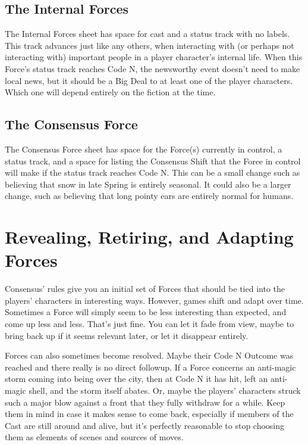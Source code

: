 \documentclass[
  oneside,
  statementpaper,
  9pt]{memoir}
\begin{document}
\hypertarget{the-internal-forces}{%
\subsection{The Internal Forces}\label{the-internal-forces}}

The Internal Forces sheet has space for cast and a status track with no
labels. This track advances just like any others, when interacting with
(or perhaps not interacting with) important people in a player
character's internal life. When this Force's status track reaches Code
N, the newsworthy event doesn't need to make local news, but it should
be a Big Deal to at least one of the player characters. Which one will
depend entirely on the fiction at the time.

\hypertarget{the-consensus-force}{%
\subsection{The Consensus Force}\label{the-consensus-force}}

The Consensus Force sheet has space for the Force(s) currently in
control, a status track, and a space for listing the Consensus Shift
that the Force in control will make if the status track reaches Code N.
This can be a small change such as believing that snow in late Spring is
entirely seasonal. It could also be a larger change, such as believing
that long pointy ears are entirely normal for humans.

\hypertarget{revealing-retiring-and-adapting-forces}{%
\section{Revealing, Retiring, and Adapting
Forces}\label{revealing-retiring-and-adapting-forces}}

Consensus' rules give you an initial set of Forces that should be tied
into the players' characters in interesting ways. However, games shift
and adapt over time. Sometimes a Force will simply seem to be less
interesting than expected, and come up less and less. That's just fine.
You can let it fade from view, maybe to bring back up if it seems
relevant later, or let it disappear entirely.

Forces can also sometimes become resolved. Maybe their Code N Outcome
was reached and there really is no direct followup. If a Force concerns
an anti-magic storm coming into being over the city, then at Code N it
has hit, left an anti-magic shell, and the storm itself abates. Or,
maybe the players' characters struck such a major blow against a front
that they fully withdraw for a while. Keep them in mind in case it makes
sense to come back, especially if members of the Cast are still around
and alive, but it's perfectly reasonable to stop choosing them as
elements of scenes and sources of moves.
\end{document}
